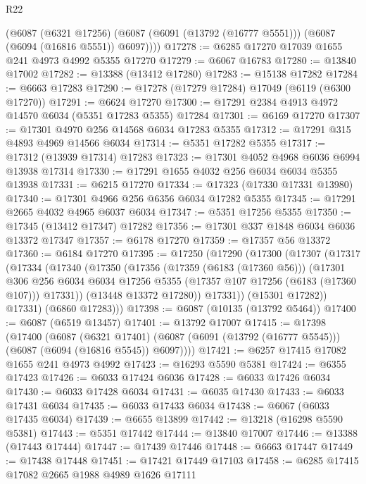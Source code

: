 \begin{lexlean}{R22}
\begin{coremodule}
      (@6087
        (@6321 @17256)
        (@6087 (@6091 (@13792 (@16777 @5551))) (@6087 (@6094 (@16816 @5551)) @6097))))
@17278 := @6285 @17270 @17039 @1655 @241 @4973 @4992 @5355 @17270
@17279 := @6067 @16783
@17280 := @13840 @17002
@17282 := @13388 (@13412 @17280)
@17283 := @15138 @17282
@17284 := @6663 @17283
@17290 := @17278 (@17279 @17284) @17049 (@6119 (@6300 @17270))
@17291 := @6624 @17270
@17300 := @17291 @2384 @4913 @4972 @14570 @6034 (@5351 @17283 @5355) @17284
@17301 := @6169 @17270
@17307 := @17301 @4970 @256 @14568 @6034 @17283 @5355
@17312 := @17291 @315 @4893 @4969 @14566 @6034
@17314 := @5351 @17282 @5355
@17317 := @17312 (@13939 @17314) @17283
@17323 := @17301 @4052 @4968 @6036 @6994 @13938 @17314
@17330 := @17291 @1655 @4032 @256 @6034 @6034 @5355 @13938
@17331 := @6215 @17270
@17334 := @17323 (@17330 @17331 @13980)
@17340 := @17301 @4966 @256 @6356 @6034 @17282 @5355
@17345 := @17291 @2665 @4032 @4965 @6037 @6034
@17347 := @5351 @17256 @5355
@17350 := @17345 (@13412 @17347) @17282
@17356 := @17301 @337 @1848 @6034 @6036 @13372 @17347
@17357 := @6178 @17270
@17359 := @17357 @56 @13372
@17360 := @6184 @17270
@17395 := @17250
    (@17290
      (@17300
        (@17307
          (@17317
            (@17334
              (@17340
                (@17350
                  (@17356
                    (@17359 (@6183 (@17360 @56)))
                    (@17301
                      @306
                      @256
                      @6034
                      @6034
                      @17256
                      @5355
                      (@17357 @107 @17256 (@6183 (@17360 @107)))
                      @17331))
                  (@13448 @13372 @17280))
                @17331))
            (@15301 @17282))
          @17331)
        (@6860 @17283)))
@17398 := @6087 (@10135 (@13792 @5464))
@17400 := @6087 (@6519 @13457)
@17401 := @13792 @17007
@17415 := @17398
    (@17400
      (@6087
        (@6321 @17401)
        (@6087 (@6091 (@13792 (@16777 @5545))) (@6087 (@6094 (@16816 @5545)) @6097))))
@17421 := @6257 @17415 @17082 @1655 @241 @4973 @4992
@17423 := @16293 @5590 @5381
@17424 := @6355 @17423
@17426 := @6033 @17424 @6036
@17428 := @6033 @17426 @6034
@17430 := @6033 @17428 @6034
@17431 := @6035 @17430
@17433 := @6033 @17431 @6034
@17435 := @6033 @17433 @6034
@17438 := @6067 (@6033 @17435 @6034)
@17439 := @6655 @13899
@17442 := @13218 (@16298 @5590 @5381)
@17443 := @5351 @17442
@17444 := @13840 @17007
@17446 := @13388 (@17443 @17444)
@17447 := @17439 @17446
@17448 := @6663 @17447
@17449 := @17438 @17448
@17451 := @17421 @17449 @17103
@17458 := @6285 @17415 @17082 @2665 @1988 @4989 @1626 @17111

\end{coremodule}
\end{lexlean}
